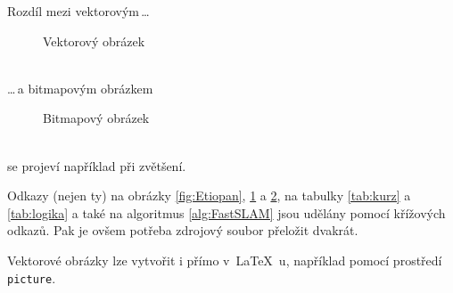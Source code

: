 \documentclass[11pt, a4paper]{article}
\begin{document}
Rozdíl mezi vektorovým\,\dots \par
\begin{figure}[ht]
    \centering
    \caption{Vektorový obrázek}
    \label{fig:vector}
\end{figure}
\noindent
\\\dots\,a bitmapovým obrázkem \par
\begin{figure}[ht]
    \centering
    \caption{Bitmapový obrázek}
    \label{fig:bitmap}
\end{figure}

\noindent
\\se projeví například při zvětšení.

Odkazy (nejen ty) na obrázky \ref{fig:Etiopan}, \ref{fig:vector} a \ref{fig:bitmap}, na tabulky \ref{tab:kurz} a \ref{tab:logika} a také na algoritmus \ref{alg:FastSLAM} jsou udělány pomocí křížových odkazů. Pak je ovšem potřeba zdrojový soubor přeložit dvakrát.\par
Vektorové obrázky lze vytvořit i přímo v~\LaTeX ~u, například pomocí prostředí\texttt{ picture}.
\end{document}
